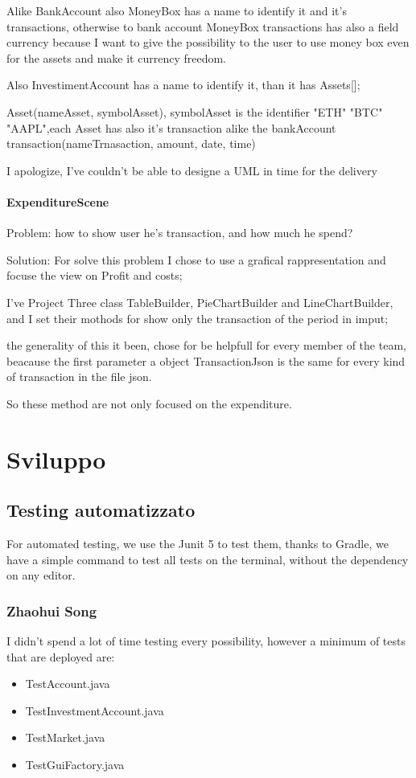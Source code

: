 \documentclass[a4paper,12pt]{report}
\begin{document}
		Alike BankAccount also MoneyBox has a name to identify it and it's transactions, otherwise to bank account MoneyBox transactions has also a field currency because I want to give the possibility to the user to use money box even for the assets and make it currency freedom.
		
		Also InvestimentAccount has a name to identify it, than it  has Assets[];
		
		Asset(nameAsset, symbolAsset), symbolAsset is the identifier "ETH" "BTC" "AAPL",each Asset has also it's transaction alike the bankAccount transaction(nameTrnasaction, amount, date, time)
		
		I apologize, I've couldn't be able to designe a UML in time for the delivery

	\subsubsection{ExpenditureScene}
	Problem: how to show user he's transaction, and how much he spend?
	
	Solution: For solve this problem I chose to use a grafical rappresentation and focuse the view on Profit and costs;
	
	I've Project Three class TableBuilder, PieChartBuilder and LineChartBuilder, and I set their mothods for show only the transaction of the period in imput;
	
	the generality of this it been, chose for be helpfull for every member of the team, beacause the first parameter a object TransactionJson is the same for every kind of transaction in the file json.
	
	So these method are not only focused on the expenditure.
	
	 

\chapter{Sviluppo}
\section{Testing automatizzato}
For automated testing, we use the Junit 5 to test them, thanks to Gradle, we have a simple command to test all tests on the terminal, without the dependency on any editor. 

\subsection{Zhaohui Song}
I didn't spend a lot of time testing every possibility, however a minimum of tests that are deployed are:
\begin{itemize}
    \item TestAccount.java
    \item TestInvestmentAccount.java
    \item TestMarket.java
    \item TestGuiFactory.java
\end{itemize}
\end{document}
